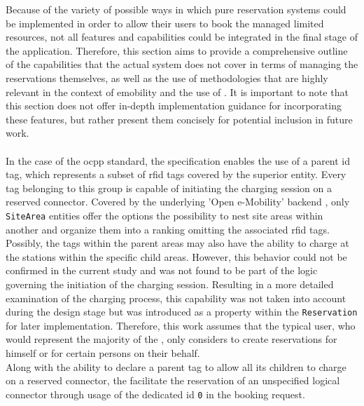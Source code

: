 Because of the variety of possible ways in which pure reservation systems could be implemented in order to allow their users to book the managed limited resources, not all features and capabilities could be integrated in the final stage of the application.
Therefore, this section aims to provide a comprehensive outline of the capabilities that the actual system does not cover in terms of managing the reservations themselves, as well as the use of methodologies that are highly relevant in the context of \acrshort{emobility} and the use of .
It is important to note that this section does not offer in-depth implementation guidance for incorporating these features, but rather present them concisely for potential inclusion in future work. \\ \\
\noindent In the case of the \acrshort{ocpp} standard, the specification enables the use of a parent \acrshort{id} tag, which represents a subset of \acrshort{rfid} tags covered by the superior entity. Every tag belonging to this group is capable of initiating the charging session on a reserved connector.
Covered by the underlying 'Open e-Mobility' backend \cite{noauthor_github_nodate-2}, only \texttt{SiteArea} entities offer the options the possibility to nest site areas within another and organize them into a ranking omitting the associated \acrshort{rfid} tags.
Possibly, the tags within the parent areas may also have the ability to charge at the stations within the specific child areas. However, this behavior could not be confirmed in the current study and was not found to be part of the logic governing the initiation of the charging session.
Resulting in a more detailed examination of the charging process, this capability was not taken into account during the design stage but was introduced as a property within the \texttt{Reservation} for later implementation.
Therefore, this work assumes that the typical user, who would represent the majority of the , only considers to create reservations for himself or for certain persons on their behalf. \\ 
Along with the ability to declare a parent tag to allow all its children to charge on a reserved connector, the  facilitate the reservation of an unspecified logical connector through usage of the dedicated \acrshort{id} \texttt{0} in the booking request.
